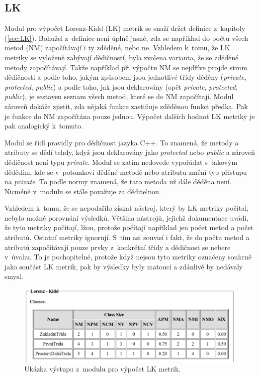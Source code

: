 \documentclass[11pt,twoside,a4paper]{book}
\begin{document}
\subsection{LK}
Modul pro výpočet Lorenz-Kidd (LK) metrik se snaží držet definice z~kapitoly (\ref{sec:LK}).
Bohužel z~definice není úplně jasné, zda se například do počtu všech metod (NM) započítávají
i ty zděděné, nebo ne. Vzhledem k~tomu, že LK metriky se vyloženě zabývají dědičností,
byla zvolena varianta, že se zděděné metody započítávají. Takže například při výpočtu
NM se nejdříve projde strom dědičnosti a podle toho, jakým způsobem jsou jednotlivé třídy děděny
(\textit{private}, \textit{protected}, \textit{public}) a podle toho, jak jsou deklarovány
(opět \textit{private}, \textit{protected}, \textit{public}), je sestaven seznam všech metod,
které se do NM započítají. Modul zároveň dokáže zjistit, zda nějaká funkce zastiňuje zděděnou
funkci předka. Pak je funkce do NM započítána pouze jednou. Výpočet dalších hodnot LK metriky
je pak analogický k~tomuto.

Modul se řídí pravidly pro dědičnost jazyka C++. To znamená, že
metody a atributy se dědí tehdy, když jsou deklarovány jako \textit{protected}
nebo \textit{public} a zároveň dědičnost není typu \textit{private}.
Modul se zatím nedovede vypořádat s~takovým dědědím, kde se v~potomkovi děděné metodě nebo atributu změní typ přístupu na \textit{private}.
To podle normy znamená, že tato metoda už dále děděna není. Nicméně v~modulu se stále považuje za děditelnou.

Vzhledem k~tomu, že se nepodařilo získat nástroj, který by LK metriky počítal, nebylo možné porovnání výsledků.
Většina nástrojů, jejichž dokumentace uvádí, že tyto metriky počítají, lžou, protože počítají například jen počet metod a počet atributů.
Ostatní metriky ignorují. S~tím asi souvisí i fakt, že do počtu metod a atributů
započítávají pouze prvky z~konkrétní třídy a dědičnost se nebere v~úvahu. To je pochopitelné, protože
když nejsou tyto metriky označeny souhrně jako součást LK metrik, pak by výsledky byly matoucí
a zdánlivě by nedávaly smysl.

\begin{figure}[H]
\begin{center}
\includegraphics[width=15cm]{figures/output_lk.pdf}
\caption{Ukázka výstupu z~modulu pro výpočet LK metrik.}
\label{fig:out_lk}
\end{center}
\end{figure}
\end{document}
